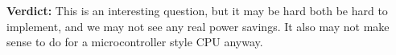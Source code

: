 \documentclass[12pt]{article}
\begin{document}
\textbf{Verdict:} This is an interesting question, but it may be hard both be hard to implement, and we
may not see any real power savings. It also may not make sense to do for a microcontroller style CPU anyway.


%
%


\end{document}
